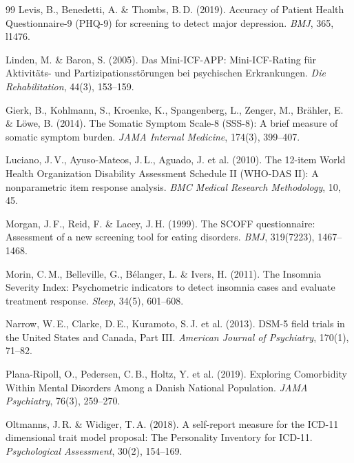 \documentclass[11pt,a4paper]{article}
\begin{document}
\begin{thebibliography}{99}
Levis, B., Benedetti, A. \& Thombs, B.\,D. (2019).
\newblock Accuracy of Patient Health Questionnaire-9 (PHQ-9) for screening to detect major depression.
\newblock \textit{BMJ}, 365, l1476.

Linden, M. \& Baron, S. (2005).
\newblock Das Mini-ICF-APP: Mini-ICF-Rating f\"ur Aktivit\"ats- und Partizipationsst\"orungen bei psychischen Erkrankungen.
\newblock \textit{Die Rehabilitation}, 44(3), 153--159.

Gierk, B., Kohlmann, S., Kroenke, K., Spangenberg, L., Zenger, M., Br\"ahler, E. \& L\"owe, B. (2014).
\newblock The Somatic Symptom Scale-8 (SSS-8): A brief measure of somatic symptom burden.
\newblock \textit{JAMA Internal Medicine}, 174(3), 399--407.

Luciano, J.\,V., Ayuso-Mateos, J.\,L., Aguado, J. et al. (2010).
\newblock The 12-item World Health Organization Disability Assessment Schedule II (WHO-DAS II): A nonparametric item response analysis.
\newblock \textit{BMC Medical Research Methodology}, 10, 45.

Morgan, J.\,F., Reid, F. \& Lacey, J.\,H. (1999).
\newblock The SCOFF questionnaire: Assessment of a new screening tool for eating disorders.
\newblock \textit{BMJ}, 319(7223), 1467--1468.

Morin, C.\,M., Belleville, G., B\'elanger, L. \& Ivers, H. (2011).
\newblock The Insomnia Severity Index: Psychometric indicators to detect insomnia cases and evaluate treatment response.
\newblock \textit{Sleep}, 34(5), 601--608.

Narrow, W.\,E., Clarke, D.\,E., Kuramoto, S.\,J. et al. (2013).
\newblock DSM-5 field trials in the United States and Canada, Part III.
\newblock \textit{American Journal of Psychiatry}, 170(1), 71--82.

Plana-Ripoll, O., Pedersen, C.\,B., Holtz, Y. et al. (2019).
\newblock Exploring Comorbidity Within Mental Disorders Among a Danish National Population.
\newblock \textit{JAMA Psychiatry}, 76(3), 259--270.

Oltmanns, J.\,R. \& Widiger, T.\,A. (2018).
\newblock A self-report measure for the ICD-11 dimensional trait model proposal: The Personality Inventory for ICD-11.
\newblock \textit{Psychological Assessment}, 30(2), 154--169.


\end{thebibliography}
\end{document}
